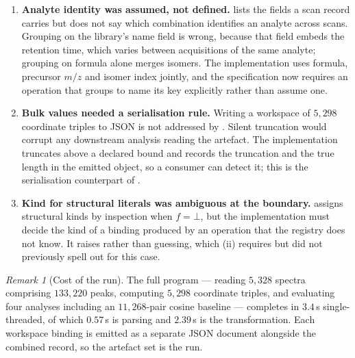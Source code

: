 \documentclass[11pt,twocolumn,a4paper]{article}
\theoremstyle{ssthm}
\theoremstyle{definition}
\theoremstyle{remark}
\newtheorem{remark}[theorem]{Remark}
\begin{document}
\begin{enumerate}[label=\textbf{D\arabic*.},leftmargin=2.8em,itemsep=3pt]
\item \textbf{Analyte identity was assumed, not defined.}
       lists the fields a scan record carries but does not
      say which combination identifies an analyte across scans. Grouping
      on the library's name field is wrong, because that field embeds
      the retention time, which varies between acquisitions of the same
      analyte; grouping on formula alone merges isomers. The
      implementation uses formula, precursor $m/z$ and isomer index
      jointly, and the specification now requires an operation that
      groups to name its key explicitly rather than assume one.

\item \textbf{Bulk values needed a serialisation rule.} Writing a
      workspace of $5{,}298$ coordinate triples to JSON is not
      addressed by . Silent truncation would corrupt any
      downstream analysis reading the artefact. The implementation
      truncates above a declared bound and records the truncation and the
      true length in the emitted object, so a consumer can detect it;
      this is the serialisation counterpart of
      .

\item \textbf{Kind for structural literals was ambiguous at the
      boundary.}  assigns structural kinds by
      inspection when $f=\bot$, but the implementation must decide the
      kind of a binding produced by an operation that the registry does
      not know. It raises rather than guessing, which
      (ii) requires but did not
      previously spell out for this case.
\end{enumerate}

\begin{remark}[Cost of the run]
\label{rem:cost}
The full program --- reading $5{,}328$ spectra comprising $133{,}220$
peaks, computing $5{,}298$ coordinate triples, and evaluating four
analyses including an $11{,}268$-pair cosine baseline --- completes in
$3.4$\,s single-threaded, of which $0.57$\,s is parsing and $2.39$\,s is
the transformation. Each workspace binding is emitted as a separate JSON
document alongside the combined record, so the artefact set is the run.
\end{remark}

\end{document}
